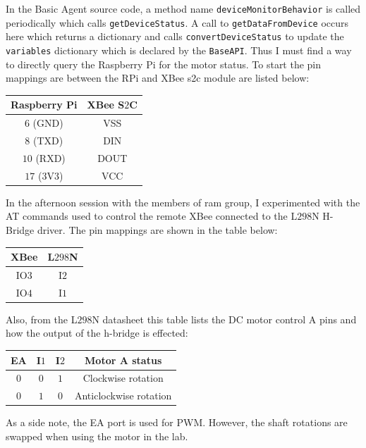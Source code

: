 \documentclass[fontsize=11pt, %
                             paper=letter, %
                             twoside, %
                             captions=tableheading,
                             index=totoc,
                             hyperref]{labbook}
\begin{document}
\begin{addmargin}[0cm]{0cm}
In the Basic Agent source code, a method name \texttt{deviceMonitorBehavior} is called periodically which calls \texttt{getDeviceStatus}. A call to \texttt{getDataFromDevice} occurs here which returns a dictionary and calls \texttt{convertDeviceStatus} to update the \texttt{variables} dictionary which is declared by the \texttt{BaseAPI}. Thus I must find a way to directly query the Raspberry Pi for the motor status. To start the pin mappings are between the RPi and XBee s2c module are listed below:

\begin{center}
\begin{tabular}{|c|c|}
\hline
Raspberry Pi & XBee S$2$C\\
\hline
$6$ (GND) & VSS\\
$8$ (TXD) & DIN\\
$10$ (RXD) & DOUT\\
$17$ ($3$V$3$) & VCC\\
\hline
\end{tabular}
\end{center}

In the afternoon session with the members of ram group, I experimented with the AT commands used to control the remote XBee connected to the L$298$N H-Bridge driver. The pin mappings are shown in the table below:
\bigbreak
\begin{center}
\begin{tabular}{|c|c|}
\hline
XBee & L$298$N\\
\hline
IO$3$ & I$2$\\
\hline
IO$4$ & I$1$\\
\hline
\end{tabular}
\end{center}
\bigbreak
Also, from the L$298$N datasheet this table lists the DC motor control A pins and how the output of the h-bridge is effected:
\bigbreak
\begin{center}
\begin{tabular}{|c|c|c|c|}
\hline
EA & I$1$ & I$2$ & Motor A status\\
\hline
$0$ & $0$ & $1$ & Clockwise rotation\\
\hline
$0$ & $1$ & $0$ & Anticlockwise rotation\\
\hline
\end{tabular}
\end{center}
\bigbreak
As a side note, the EA port is used for PWM.
\bigbreak
However, the shaft rotations are swapped when using the motor in the lab.


\end{addmargin}
\end{document}
